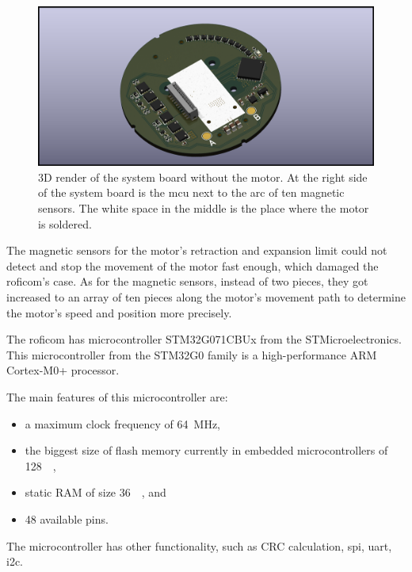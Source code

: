 \documentclass[
  digital,     %
  oneside,     %
  nosansbold,  %
  nocolorbold, %
  nolof,         %
  nolot,         %
]{fithesis4}
\begin{document}
\begin{figure}
    \includegraphics[width=\textwidth,height=\textheight,keepaspectratio]{assets/control_board.png}
    \caption[3D render of the system board]{3D render of the system board without the motor. At the
    right side of the system board is the \acrshort{mcu} next to the arc of ten magnetic sensors.
    The white space in the middle is the place where the motor is soldered.}
    \label{fig:roficom-board}
\end{figure}

The magnetic sensors for the motor's retraction and expansion limit could not detect and stop the
movement of the motor fast enough, which damaged the \acrshort{roficom}'s case.  As for the magnetic
sensors, instead of two pieces, they got increased to an array of ten pieces along the motor's
movement path to determine the motor's speed and position more precisely.

The \acrshort{roficom} has microcontroller STM32G071CBUx from the STMicroelectronics. This
microcontroller from the STM32G0 family is a high-performance ARM Cortex-M0+ processor.

The main features of this microcontroller are:
\begin{itemize}
    \item a maximum clock frequency of \qty{64}{\mega\hertz},
    \item the biggest size of flash memory currently in embedded microcontrollers of \qty{128}{\kilo\byte},
    \item static RAM of size \qty{36}{\kilo\byte}, and
    \item 48 available pins.
\end{itemize}

The microcontroller has other functionality, such as CRC calculation, \acrshort{spi}, \acrshort{uart}, \acrshort{i2c}.
\end{document}
